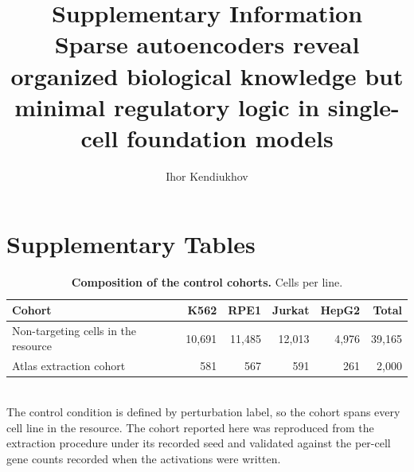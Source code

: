 \documentclass[11pt]{article}
\title{\textbf{Supplementary Information}\\[6pt]
\large Sparse autoencoders reveal organized biological knowledge but minimal regulatory
logic in single-cell foundation models}
\author{Ihor Kendiukhov}
\date{}
\begin{document}
\maketitle

\section*{Supplementary Tables}

\begin{table}[htbp]
\centering
\caption{\textbf{Composition of the control cohorts.} Cells per line.}
\label{tab:cohorts}
\smallskip
\small
\begin{tabular}{lrrrrr}
\toprule
Cohort & K562 & RPE1 & Jurkat & HepG2 & Total \\
\midrule
Non-targeting cells in the resource & 10,691 & 11,485 & 12,013 & 4,976 & 39,165 \\
Atlas extraction cohort & 581 & 567 & 591 & 261 & 2,000 \\
\bottomrule
\end{tabular}
\\[2pt]
\footnotesize The control condition is defined by perturbation label, so the cohort spans every cell line in the resource. The cohort reported here was reproduced from the extraction procedure under its recorded seed and validated against the per-cell gene counts recorded when the activations were written.
\end{table}
\end{document}
